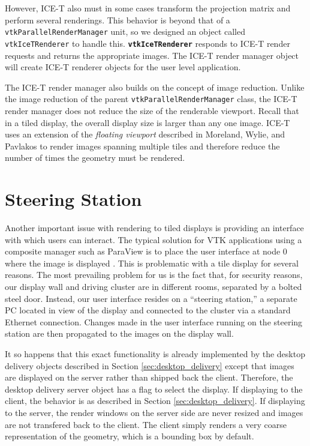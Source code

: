 \documentclass{acmsiggraph}
\newcommand{\cidentifier}[1]{\texttt{#1}}
\newcommand{\keyterm}[1]{\textbf{#1}}
\begin{document}
  However, ICE-T also must in some cases transform the projection matrix
  and perform several renderings.  This behavior is beyond that of a
  \cidentifier{vtk\-Parallel\-Render\-Manager} unit, so we designed an
  object called \cidentifier{vtk\-Ice\-T\-Renderer} to handle this.
  \keyterm{\cidentifier{vtk\-Ice\-T\-Renderer}} responds to ICE-T render
  requests and returns the appropriate images.  The ICE-T render manager
  object will create ICE-T renderer objects for the user level application.

  The ICE-T render manager also builds on the concept of image reduction.
  Unlike the image reduction of the parent
  \cidentifier{vtk\-Parallel\-Render\-Manager} class, the ICE-T render
  manager does not reduce the size of the renderable viewport.  Recall that
  in a tiled display, the overall display size is larger than any one
  image.  ICE-T uses an extension of the \emph{floating viewport} described
  in Moreland, Wylie, and Pavlakos \cite{Moreland01} to render images
  spanning multiple tiles and therefore reduce the number of times the
  geometry must be rendered.


  \section{Steering Station}
  \label{sec:steering_station}

  Another important issue with rendering to tiled displays is providing an
  interface with which users can interact.  The typical solution for VTK
  applications using a composite manager such as ParaView is to place the
  user interface at node 0 where the image is displayed \cite{Law01}.  This
  is problematic with a tile display for several reasons.  The most
  prevailing problem for us is the fact that, for security reasons, our
  display wall and driving cluster are in different rooms, separated by a
  bolted steel door.  Instead, our user interface resides on a ``steering
  station,'' a separate PC located in view of the display and connected to
  the cluster via a standard Ethernet connection.  Changes made in the user
  interface running on the steering station are then propagated to the
  images on the display wall.

  It so happens that this exact functionality is already implemented by the
  desktop delivery objects described in Section \ref{sec:desktop_delivery}
  except that images are displayed on the server rather than shipped back
  the client.  Therefore, the desktop delivery server object has a flag to
  select the display.  If displaying to the client, the behavior is as
  described in Section \ref{sec:desktop_delivery}.  If displaying to the
  server, the render windows on the server side are never resized and
  images are not transfered back to the client.  The client simply renders
  a very coarse representation of the geometry, which is a bounding box by
  default.
\end{document}

